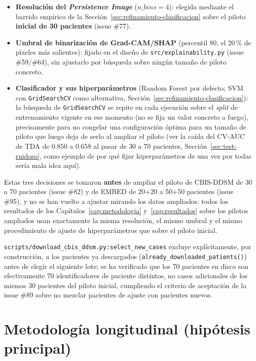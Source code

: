 \begin{itemize}
  \item \textbf{Resolución del \textit{Persistence Image}} ($n\_bins=4$):
        elegida mediante el barrido empírico de la Sección~\ref{sec:refinamiento-clasificacion}
        sobre el piloto \textbf{inicial de 30 pacientes} (issue \#77).
  \item \textbf{Umbral de binarización de Grad-CAM/SHAP} (percentil 80,
        el 20\,\% de píxeles más salientes): fijado en el diseño de
        \texttt{src/explainability.py} (issue \#59/\#64), sin ajustarlo
        por búsqueda sobre ningún tamaño de piloto concreto.
  \item \textbf{Clasificador y sus hiperparámetros} (Random Forest por
        defecto; SVM con \texttt{GridSearchCV} como alternativa,
        Sección~\ref{sec:refinamiento-clasificacion}): la búsqueda de
        \texttt{GridSearchCV} se repite en cada ejecución sobre el
        \textit{split} de entrenamiento vigente en ese momento (no se fija
        un valor concreto a fuego), precisamente para no congelar una
        configuración óptima para un tamaño de piloto que luego deja de
        serlo al ampliar el piloto (ver la caída del CV-AUC de TDA de
        $0.850$ a $0.658$ al pasar de 30 a 70 pacientes,
        Sección~\ref{sec:test-ruidoso}, como ejemplo de por qué fijar
        hiperparámetros de una vez por todas sería mala idea aquí).
\end{itemize}

Estas tres decisiones se tomaron \textbf{antes} de ampliar el piloto de
CBIS-DDSM de 30 a 70 pacientes (issue \#82) y de EMBED de 20+20 a 50+50
pacientes (issue \#95), y no se han vuelto a ajustar mirando los datos
ampliados: todos los resultados de los Capítulos~\ref{cap:metodologia}
y~\ref{cap:resultados} sobre los pilotos ampliados usan exactamente la
misma resolución, el mismo umbral y el mismo procedimiento de ajuste de
hiperparámetros que sobre el piloto inicial.

\texttt{scripts/download\_cbis\_ddsm.py:select\_new\_cases} excluye
explícitamente, por construcción, a los pacientes ya descargados
(\texttt{already\_downloaded\_patients()}) antes de elegir el siguiente
lote; se ha verificado que los 70 pacientes en disco son efectivamente 70
identificadores de paciente distintos, no casos adicionales de los mismos
30 pacientes del piloto inicial, cumpliendo el criterio de aceptación de
la issue \#89 sobre no mezclar pacientes de ajuste con pacientes nuevos.

\section{Metodología longitudinal (hipótesis principal)}
\label{sec:metodologia-longitudinal}

